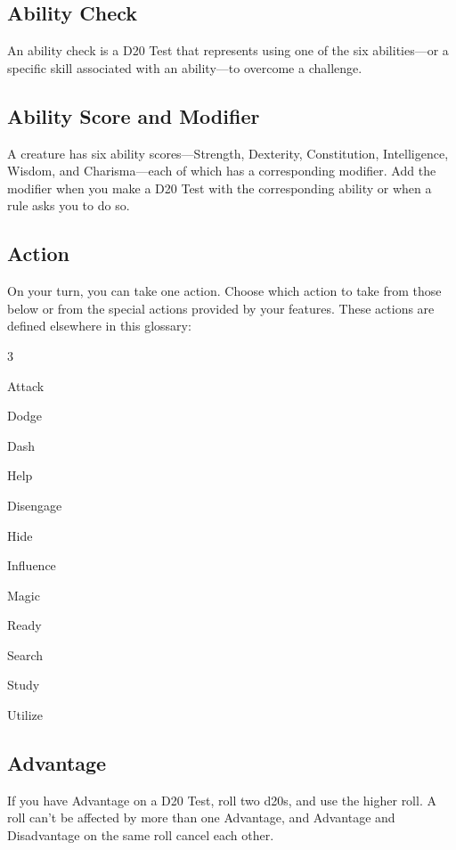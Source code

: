 \documentclass[10pt,a4paper,twoside,bg=print,twocolumn,openany,nodeprecatedcode]{dndarticle}
\begin{document}
\subsection{Ability Check}
An ability check is a D20 Test that represents using one of the six abilities—or a specific skill associated with an ability—to overcome a challenge.

\subsection{Ability Score and Modifier}
A creature has six ability scores—Strength, Dexterity, Constitution, Intelligence, Wisdom, and Charisma—each of which has a corresponding modifier. Add the modifier when you make a D20 Test with the corresponding ability or when a rule asks you to do so.

\subsection{Action}
On your turn, you can take one action. Choose which action to take from those below or from the special actions provided by your features. These actions are defined elsewhere in this glossary:

\begin{description}
\dndsans
\begin{multicols}{3}
\item Attack
\item Dodge
\item Dash
\item Help
\item Disengage
\item Hide
\item Influence
\item Magic
\item Ready
\item Search
\item Study
\item Utilize
\end{multicols}
\end{description}

\subsection{Advantage}
If you have Advantage on a D20 Test, roll two d20s, and use the higher roll. A roll can't be affected by more than one Advantage, and Advantage and Disadvantage on the same roll cancel each other.
\end{document}
